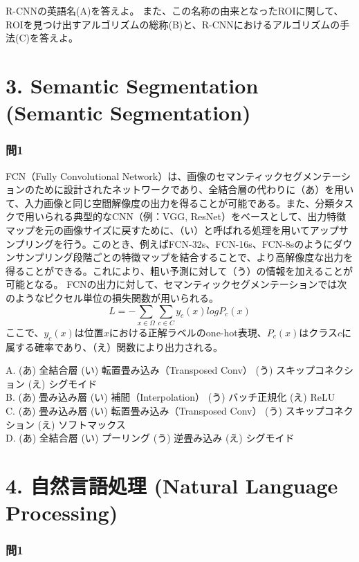 \documentclass[
  letterpaper,
  DIV=11,
  numbers=noendperiod]{scrreprt}
\begin{document}
R-CNNの英語名(A)を答えよ。
また、この名称の由来となったROIに関して、ROIを見つけ出すアルゴリズムの総称(B)と、R-CNNにおけるアルゴリズムの手法(C)を答えよ。

\chapter{3. Semantic Segmentation (Semantic
Segmentation)}\label{semantic-segmentation-semantic-segmentation}

\subsection{問1}\label{ux554f1-1}

FCN（Fully Convolutional
Network）は、画像のセマンティックセグメンテーションのために設計されたネットワークであり、全結合層の代わりに（あ）を用いて、入力画像と同じ空間解像度の出力を得ることが可能である。また、分類タスクで用いられる典型的なCNN（例：VGG,
ResNet）をベースとして、出力特徴マップを元の画像サイズに戻すために、（い）と呼ばれる処理を用いてアップサンプリングを行う。このとき、例えばFCN-32s、FCN-16s、FCN-8sのようにダウンサンプリング段階ごとの特徴マップを結合することで、より高解像度な出力を得ることができる。これにより、粗い予測に対して（う）の情報を加えることが可能となる。
FCNの出力に対して、セマンティックセグメンテーションでは次のようなピクセル単位の損失関数が用いられる。
\[
𝐿=−∑_{𝑥∈Ω}∑_{c∈C}y_c(x)logP_c(x)
\]
ここで、\(y_c(x)\)は位置\(x\)における正解ラベルのone-hot表現、\(P_c(x)\)はクラス\(c\)に属する確率であり、（え）関数により出力される。

A. (あ) 全結合層 (い) 転置畳み込み（Transposed Conv） (う)
スキップコネクション (え) シグモイド\\
B. (あ) 畳み込み層 (い) 補間（Interpolation） (う) バッチ正規化 (え)
ReLU\\
C. (あ) 畳み込み層 (い) 転置畳み込み（Transposed Conv） (う)
スキップコネクション (え) ソフトマックス\\
D. (あ) 全結合層 (い) プーリング (う) 逆畳み込み (え) シグモイド

\chapter{4. 自然言語処理 (Natural Language
Processing)}\label{ux81eaux7136ux8a00ux8a9eux51e6ux7406-natural-language-processing}

\subsection{問1}\label{ux554f1-2}
\end{document}
